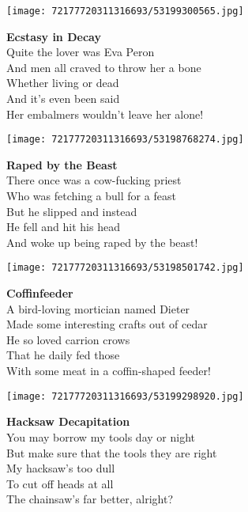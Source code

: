 \documentclass[10pt,letterpaper]{article}
\begin{document}
\begin{center}
\texttt{[image: 72177720311316693/53199300565.jpg]}
\end{center}

\begin{center}
\textbf{Ecstasy in Decay}\\
\vskip 0.2in
Quite the lover was Eva Peron\\
And men all craved to throw her a bone\\
Whether living or dead\\
And it's even been said\\
Her embalmers wouldn't leave her alone!\\
\end{center}
\pagebreak

\begin{center}
\texttt{[image: 72177720311316693/53198768274.jpg]}
\end{center}

\begin{center}
\textbf{Raped by the Beast}\\
\vskip 0.2in
There once was a cow-fucking priest\\
Who was fetching a bull for a feast\\
But he slipped and instead\\
He fell and hit his head\\
And woke up being raped by the beast!\\
\end{center}
\pagebreak

\begin{center}\texttt{[image: 72177720311316693/53198501742.jpg]}
\end{center}
\begin{center}
\textbf{Coffinfeeder}\\
\vskip 0.2in
A bird-loving mortician named Dieter\\
Made some interesting crafts out of cedar\\
He so loved carrion crows\\
That he daily fed those\\
With some meat in a coffin-shaped feeder!\\
\end{center}
\pagebreak

\begin{center}\texttt{[image: 72177720311316693/53199298920.jpg]}
\end{center}
\begin{center}
\textbf{Hacksaw Decapitation}\\
\vskip 0.2in
You may borrow my tools day or night\\
But make sure that the tools they are right\\
My hacksaw's too dull\\
To cut off heads at all\\
The chainsaw's far better, alright?\\
\end{center}
\pagebreak
\end{document}
